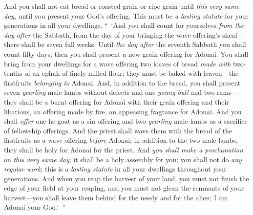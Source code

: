 \begin{biblechapter}
\verse And you shall not eat bread or roasted grain or ripe grain until \textit{this very same day}, until you present your God’s offering. This must be \textit{a lasting statute} for your generations in all your dwellings.
 “ ‘And you shall count for yourselves \textit{from the day after} the Sabbath, from the day of your bringing the wave offering’s sheaf—there shall be seven full weeks.
\verse Until \textit{the day after} the seventh Sabbath you shall count fifty days; then you shall present a new grain offering for Adonai.
\verse You shall bring from your dwellings for a wave offering two loaves of bread \textit{made with} two-tenths of an ephah of finely milled flour; they must be baked with leaven—the firstfruits \textit{belonging to} Adonai.
\verse And, in addition to the bread, you shall present seven \textit{yearling} male lambs without defects and one \textit{young bull} and two rams—they shall be a burnt offering for Adonai with their grain offering and their libations, an offering made by fire, an appeasing fragrance for Adonai.
\verse And you shall \textit{offer} one he-goat as a sin offering and two \textit{yearling} male lambs as a sacrifice of fellowship offerings.
\verse And the priest shall wave them with the bread of the firstfruits as a wave offering \textit{before} Adonai; in addition to the two male lambs, they shall be holy for Adonai for the priest.
\verse And \textit{you shall make a proclamation} on \textit{this very same day}; it shall be a holy assembly for you; you shall not do \textit{any regular work}; this is a \textit{lasting statute} in all your dwellings throughout your generations.
\verse And when you reap the harvest of your land, you must not finish the edge of your field at your reaping, and you must not glean the remnants of your harvest—you shall leave them behind for the needy and for the alien; I am Adonai your God.’ ”

\end{biblechapter}
